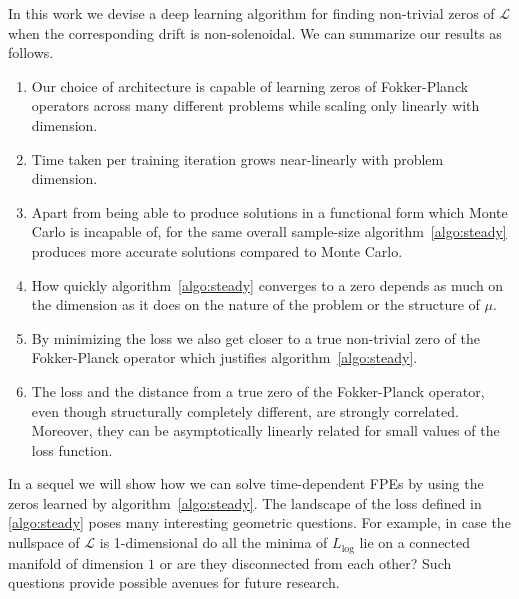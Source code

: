 In this work we devise a deep learning algorithm  for finding non-trivial zeros of $\mathcal L$ when the corresponding drift is non-solenoidal. We can summarize our results as follows. 
\begin{enumerate}
    \item Our choice of architecture is capable of learning zeros of Fokker-Planck operators across many different problems while scaling only linearly with dimension.
    \item Time taken per training iteration grows near-linearly with problem dimension.
    \item Apart from being able to produce solutions in a functional form which Monte Carlo is incapable of, for the same overall sample-size algorithm~\ref{algo:steady} produces more accurate solutions compared to Monte Carlo.
    \item How quickly algorithm~\ref{algo:steady} converges to a zero depends as much on the dimension as it does on the nature of the problem or the structure of $\mu$.
    \item By minimizing the loss we also get closer to a true non-trivial zero of the Fokker-Planck operator which justifies algorithm~\ref{algo:steady}.
    \item The loss and the distance from a true zero of the Fokker-Planck operator, even though structurally completely different, are strongly correlated. Moreover, they can be asymptotically linearly related for small values of the loss function.
\end{enumerate}
In a sequel we will show how we can solve time-dependent FPEs by using the zeros learned by algorithm~\ref{algo:steady}. The landscape of the loss defined in \eqref{algo:steady} poses many interesting geometric questions. For example, in case the nullspace of $\mathcal L$ is 1-dimensional do all the minima of $L_{\log}$ lie on a connected manifold of dimension $1$
or are they disconnected from each other? Such questions provide possible avenues for future research.

